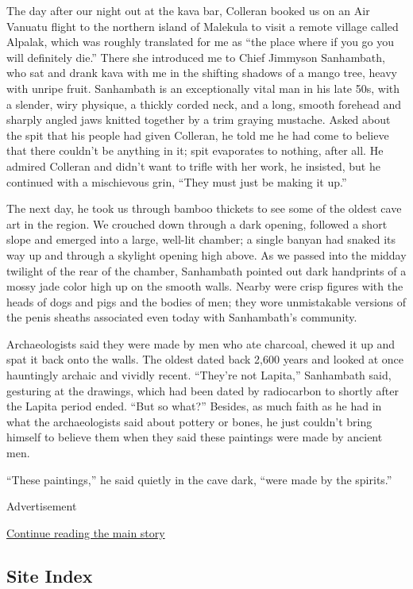 The day after our night out at the kava bar, Colleran booked us on an
Air Vanuatu flight to the northern island of Malekula to visit a remote
village called Alpalak, which was roughly translated for me as ``the
place where if you go you will definitely die.'' There she introduced me
to Chief Jimmyson Sanhambath, who sat and drank kava with me in the
shifting shadows of a mango tree, heavy with unripe fruit. Sanhambath is
an exceptionally vital man in his late 50s, with a slender, wiry
physique, a thickly corded neck, and a long, smooth forehead and sharply
angled jaws knitted together by a trim graying mustache. Asked about the
spit that his people had given Colleran, he told me he had come to
believe that there couldn't be anything in it; spit evaporates to
nothing, after all. He admired Colleran and didn't want to trifle with
her work, he insisted, but he continued with a mischievous grin, ``They
must just be making it up.''

The next day, he took us through bamboo thickets to see some of the
oldest cave art in the region. We crouched down through a dark opening,
followed a short slope and emerged into a large, well-lit chamber; a
single banyan had snaked its way up and through a skylight opening high
above. As we passed into the midday twilight of the rear of the chamber,
Sanhambath pointed out dark handprints of a mossy jade color high up on
the smooth walls. Nearby were crisp figures with the heads of dogs and
pigs and the bodies of men; they wore unmistakable versions of the penis
sheaths associated even today with Sanhambath's community.

Archaeologists said they were made by men who ate charcoal, chewed it up
and spat it back onto the walls. The oldest dated back 2,600 years and
looked at once hauntingly archaic and vividly recent. ``They're not
Lapita,'' Sanhambath said, gesturing at the drawings, which had been
dated by radiocarbon to shortly after the Lapita period ended. ``But so
what?'' Besides, as much faith as he had in what the archaeologists said
about pottery or bones, he just couldn't bring himself to believe them
when they said these paintings were made by ancient men.

``These paintings,'' he said quietly in the cave dark, ``were made by
the spirits.''

Advertisement

\protect\hyperlink{after-bottom}{Continue reading the main story}

\hypertarget{site-index}{%
\subsection{Site Index}\label{site-index}}

